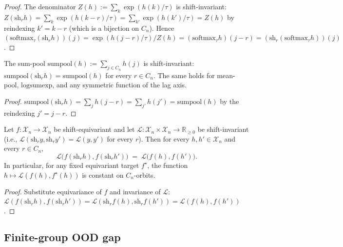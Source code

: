 \begin{proof}
The denominator $Z(h) := \sum_k \exp(h(k)/\tau)$ is shift-invariant:
$Z(\mathrm{sh}_r h) = \sum_k \exp(h(k-r)/\tau) = \sum_{k'} \exp(h(k')/\tau) = Z(h)$
by reindexing $k' = k - r$ (which is a bijection on $C_n$).  Hence
$(\mathrm{softmax}_\tau (\mathrm{sh}_r h))(j) = \exp(h(j-r)/\tau)/Z(h) =
(\mathrm{softmax}_\tau h)(j - r) = (\mathrm{sh}_r (\mathrm{softmax}_\tau h))(j)$.
\end{proof}

\begin{theorem}
\label{thm:pooled-inv}
The sum-pool $\mathrm{sumpool}(h) := \sum_{j \in C_n} h(j)$ is
shift-invariant: $\mathrm{sumpool}(\mathrm{sh}_r h) = \mathrm{sumpool}(h)$
for every $r \in C_n$.  The same holds for mean-pool,
$\mathrm{logsumexp}$, and any symmetric function of the lag axis.
\end{theorem}

\begin{proof}
$\mathrm{sumpool}(\mathrm{sh}_r h) = \sum_j h(j-r) = \sum_{j'} h(j') = \mathrm{sumpool}(h)$
by the reindexing $j' = j - r$.
\end{proof}

\begin{lemma}
\label{lem:orbit-constancy}
Let $f : \mathcal{X}_n \to \mathcal{X}_n$ be shift-equivariant and let $\mathcal{L} :
\mathcal{X}_n \times \mathcal{X}_n \to \mathbb{R}_{\ge 0}$ be shift-invariant (i.e.,
$\mathcal{L}(\mathrm{sh}_r y, \mathrm{sh}_r y') = \mathcal{L}(y, y')$ for every $r$).
Then for every $h, h' \in \mathcal{X}_n$ and every $r \in C_n$,
\[
  \mathcal{L}\bigl(f(\mathrm{sh}_r h), f(\mathrm{sh}_r h')\bigr)
  \;=\; \mathcal{L}\bigl(f(h), f(h')\bigr).
\]
In particular, for any fixed equivariant target $f^\star$, the
function $h \mapsto \mathcal{L}(f(h), f^\star(h))$ is constant on
$C_n$-orbits.
\end{lemma}

\begin{proof}
Substitute equivariance of $f$ and invariance of $\mathcal{L}$:
$\mathcal{L}(f(\mathrm{sh}_r h), f(\mathrm{sh}_r h')) =
\mathcal{L}(\mathrm{sh}_r f(h), \mathrm{sh}_r f(h')) = \mathcal{L}(f(h), f(h'))$.
\end{proof}

\subsection{Finite-group OOD gap}


